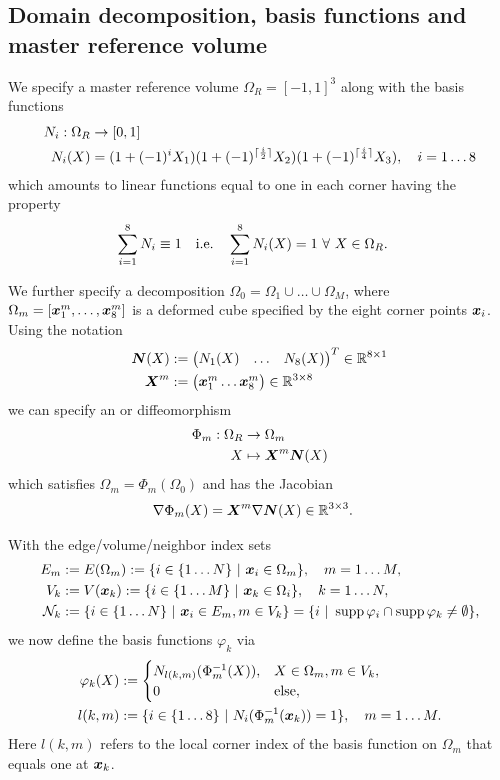 \documentclass[a4paper,12pt]{article}
\newcommand{\Nk}{\mathcal{N}_k}
\newcommand{\Or}{\Omega_0}
\newcommand{\Om}{\Omega_R}
\DeclareMathOperator{\supp}{supp}
\newcommand{\m}[1]{\ensuremath{\left(\begin{matrix}#1\end{matrix}\right)}}
\DeclarePairedDelimiter{\ceil}{\lceil}{\rceil}
\begin{document}
\subsection{Domain decomposition, basis functions and master reference volume}
We specify a master reference volume $\Om = [-1,1]^3$ along with the basis functions
\begin{align*}
	N_i:\Om &\to [0,1]\\
	N_i(X)  &= (1+(-1)^{i}X_1)(1+(-1)^{\ceil{\frac{i}{2}}}X_2)(1+(-1)^{\ceil{\frac{i}{4}}}X_3),\quad i=1\ldots 8
\end{align*}
which amounts to linear functions equal to one in each corner having the property
\begin{align}
	\suml{i=1}{8}N_i &\equiv 1 & \text{i.e.}\quad \suml{i=1}{8}N_i(X) &= 1 \fo X\in\Om.
\end{align}

We further specify a decomposition $\Or = \Omega_1\cup \ldots \cup \Omega_M$, where
$\Omega_m = [\boldsymbol{x}^m_1,\ldots,\boldsymbol{x}^m_8]$ is a deformed cube specified by the eight corner points $\boldsymbol{x}_i$.
Using the notation
\begin{align}
	\vN(X) &:= \m{N_1(X) & \ldots & N_8(X)}^T\in\R^{8\times 1}\\
	\vX^m &:= \m{\vx^m_1 \ldots \vx^m_8} \in\R^{3\times 8}
\end{align}
 we can specify an  or diffeomorphism
\begin{align}
	\Phi_m : \Om &\to \Omega_m\\
	X &\mapsto \vX^m\vN(X)
\end{align}
which satisfies $\Omega_m = \Phi_m(\Or)$ and has the Jacobian
\begin{align}
	\nabla\Phi_m(X) &= \boldsymbol{X}^m\nabla\boldsymbol{N}(X) \in \mathbb{R}^{3\times 3}.\label{def:refbasis_jacobian}
\end{align}
 
With the edge/volume/neighbor index sets
\begin{align}
	E_m &:= E(\Omega_m) := \{i\in\{1\ldots N\}~|~ \vx_i\in\Omega_m\}, \quad m=1\ldots M,\\
	V_k &:= V(\vx_k) := \{i\in\{1\ldots M\}~|~ \vx_k\in\Omega_i\}, \quad k=1\ldots N,\\
	\Nk &:= \{i\in\{1\ldots N\}~|~ \vx_i\in E_m, m\in V_k\} = \{i ~|~ \supp\varphi_i \cap \supp\varphi_k \neq\es\},
\end{align}
we now define the basis functions $\varphi_k$ via
\begin{align}
	\varphi_k(X) &:= \begin{cases}
		N_{l(k,m)}(\Phi^{-1}_m(X)), & X\in\Omega_m, m\in V_k,\\
		0 & \text{else},	
	\end{cases}\label{def:referencebasisfun}\\
	l(k,m) &:= \{i\in\{1\ldots 8\}~|~ N_i(\Phi_m^{-1}(\boldsymbol{x}_k))=1\},\quad m=1\ldots M.
\end{align}
Here $l(k,m)$ refers to the local corner index of the basis function on $\Omega_m$ that equals one at $\boldsymbol{x}_k$.
\end{document}
